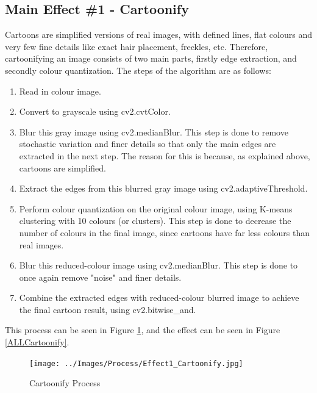 \documentclass[a4paper,10pt]{report}
\begin{document}
	\subsection{Main Effect \#1 - Cartoonify}
	Cartoons are simplified versions of real images, with defined lines, flat colours and very few fine details like exact hair placement, freckles, etc. Therefore, cartoonifying an image consists of two main parts, firstly edge extraction, and secondly colour quantization.
	The steps of the algorithm are as follows:
	\begin{enumerate}[Step 1:]
		\item Read in colour image.
		\item Convert to grayscale using cv2.cvtColor.
		\item Blur this gray image using cv2.medianBlur. This step is done to remove stochastic variation and finer details so that only the main edges are extracted in the next step. The reason for this is because, as explained above, cartoons are simplified.
		\item Extract the edges from this blurred gray image using cv2.adaptiveThreshold.
		\item Perform colour quantization on the original colour image, using K-means clustering with 10 colours (or clusters). This step is done to decrease the number of colours in the final image, since cartoons have far less colours than real images.
		\item Blur this reduced-colour image using cv2.medianBlur. This step is done to once again remove "noise" and finer details.
		\item Combine the extracted edges with reduced-colour blurred image to achieve the final cartoon result, using cv2.bitwise\_and.		
	\end{enumerate}
	This process can be seen in Figure \ref{Process_Cartoonify}, and the effect can be seen in Figure \ref{ALLCartoonify}.
	
	\begin{figure}[h]
		\caption{Cartoonify Process}
		\centering
		\texttt{[image: ../Images/Process/Effect1\_Cartoonify.jpg]}
		\label{Process_Cartoonify}
	\end{figure}
	
	
\end{document}
